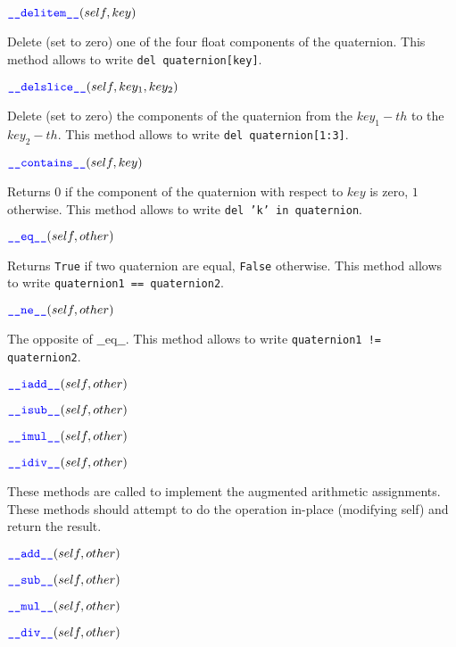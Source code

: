 \documentclass[11pt]{paper}
\begin{document}
\medskip
\noindent $\textcolor{blue}{\texttt{\_\_\mbox{delitem}\_\_}}(self,key)$

Delete (set to zero) one of the four float components of the quaternion. This method allows to write \texttt{del quaternion[key]}.

\medskip
\noindent $\textcolor{blue}{\texttt{\_\_\mbox{delslice}\_\_}}(self,key_1,key_2)$

Delete (set to zero) the components of the quaternion from the $key_1-th$ to the $key_2-th$. This method allows to write \texttt{del quaternion[1:3]}.


\medskip
\noindent $\textcolor{blue}{\texttt{\_\_\mbox{contains}\_\_}}(self,key)$

Returns $0$ if the component of the quaternion with respect to $key$ is zero, $1$ otherwise. This method allows to write \texttt{del 'k' in quaternion}.


\medskip
\noindent $\textcolor{blue}{\texttt{\_\_\mbox{eq}\_\_}}(self,other)$

Returns \texttt{True} if two quaternion are equal, \texttt{False} otherwise. This method allows to write \texttt{quaternion1 == quaternion2}.

\medskip
\noindent $\textcolor{blue}{\texttt{\_\_\mbox{ne}\_\_}}(self,other)$

The opposite of $\_\_$eq$\_\_$. This method allows to write \texttt{quaternion1 != quaternion2}.


\medskip
\noindent $\textcolor{blue}{\texttt{\_\_\mbox{iadd}\_\_}}(self,other)$

\noindent $\textcolor{blue}{\texttt{\_\_\mbox{isub}\_\_}}(self,other)$

\noindent $\textcolor{blue}{\texttt{\_\_\mbox{imul}\_\_}}(self,other)$ 

\noindent $\textcolor{blue}{\texttt{\_\_\mbox{idiv}\_\_}}(self,other)$

These methods are called to implement the augmented arithmetic assignments. These methods should attempt to do the operation in-place (modifying self) and return the result.


\medskip
\noindent $\textcolor{blue}{\texttt{\_\_\mbox{add}\_\_}}(self,other)$

\noindent $\textcolor{blue}{\texttt{\_\_\mbox{sub}\_\_}}(self,other)$

\noindent $\textcolor{blue}{\texttt{\_\_\mbox{mul}\_\_}}(self,other)$

\noindent $\textcolor{blue}{\texttt{\_\_\mbox{div}\_\_}}(self,other)$
\end{document}
